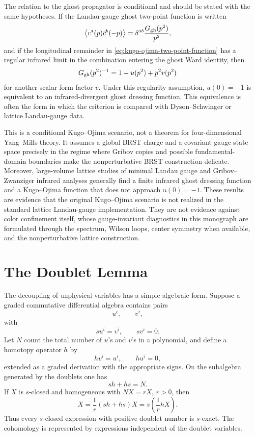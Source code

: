 The relation to the ghost propagator is conditional and should be stated with
the same hypotheses.  If the Landau-gauge ghost two-point function is written
\[
  \left\langle c^a(p)\bar c^b(-p)\right\rangle
  =
  \delta^{ab}\frac{G_{\rm gh}(p^2)}{p^2},
\]
and if the longitudinal remainder in
\eqref{eq:kugo-ojima-two-point-function} has a regular infrared limit in the
combination entering the ghost Ward identity, then
\begin{equation}
  G_{\rm gh}(p^2)^{-1}
  =
  1+u(p^2)+p^2 v(p^2)
  \label{eq:kugo-ojima-ghost-dressing-relation}
\end{equation}
for another scalar form factor \(v\).  Under this regularity assumption,
\(u(0)=-1\) is equivalent to an infrared-divergent ghost dressing function.
This equivalence is often the form in which the criterion is compared with
Dyson--Schwinger or lattice Landau-gauge data.

This is a conditional Kugo--Ojima scenario, not a theorem for
four-dimensional Yang--Mills theory.  It assumes a global BRST charge and a
covariant-gauge state space
precisely in the regime where Gribov copies and possible fundamental-domain
boundaries make the nonperturbative BRST construction delicate.  Moreover,
large-volume lattice studies of minimal Landau gauge and Gribov--Zwanziger
infrared analyses generally find a finite infrared ghost dressing function
and a Kugo--Ojima function that does not approach \(u(0)=-1\).  These results
are evidence that the original Kugo--Ojima scenario is not realized in the
standard lattice Landau-gauge implementation.  They are not evidence against
color confinement itself, whose gauge-invariant diagnostics in this monograph
are formulated through the spectrum, Wilson loops, center symmetry when
available, and the nonperturbative lattice construction.

\section{The Doublet Lemma}

The decoupling of unphysical variables has a simple algebraic form.  Suppose a
graded commutative differential algebra contains pairs
\[
  u^i,\qquad v^i,
\]
with
\[
  su^i=v^i,\qquad sv^i=0.
\]
Let \(N\) count the total number of \(u\)'s and \(v\)'s in a polynomial, and
define a homotopy operator \(h\) by
\[
  h v^i=u^i,\qquad h u^i=0,
\]
extended as a graded derivation with the appropriate signs.  On the subalgebra
generated by the doublets one has
\[
  sh+hs=N .
\]
If \(X\) is \(s\)-closed and homogeneous with \(NX=rX\), \(r>0\), then
\[
  X=\frac1r(sh+hs)X=s\left(\frac1r hX\right).
\]
Thus every \(s\)-closed expression with positive doublet number is
\(s\)-exact.  The cohomology is represented by expressions independent of the
doublet variables.

